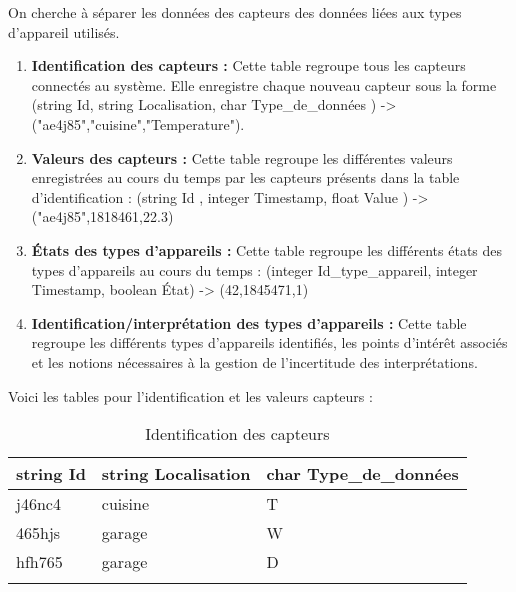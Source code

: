 \documentclass[10pt,a4paper]{article}
\begin{document}
On cherche à séparer les données des capteurs des données liées aux types d'appareil utilisés.
\begin{enumerate}
\item \textbf{Identification des capteurs :} Cette table regroupe tous les capteurs connectés au système. Elle enregistre chaque nouveau capteur sous la forme (string Id, string Localisation, char Type\_de\_données ) -> ("ae4j85","cuisine","Temperature").
\item \textbf{Valeurs des capteurs :} Cette table regroupe les différentes valeurs enregistrées au cours 
du temps par les capteurs présents dans la table d'identification : (string Id , integer Timestamp, float Value ) -> ("ae4j85",1818461,22.3)
\item \textbf{États des types d'appareils : } Cette table regroupe les différents états des types d'appareils au cours du temps : (integer Id\_type\_appareil, integer Timestamp, boolean État) -> (42,1845471,1)
\item \textbf{Identification/interprétation des types d'appareils :} Cette table regroupe les différents types d'appareils identifiés, les points d'intérêt associés et les notions nécessaires à la gestion de l'incertitude des interprétations.
\end{enumerate}
\newpage
Voici les tables pour l'identification et les valeurs capteurs :
\begin{table}[h!]
    \centering
    \begin{tabular}{|l|l|l|}
    \hline
    \rowcolor[HTML]{EFEFEF} 
    string Id & string Localisation & char Type\_de\_données \\ \hline
    j46nc4    & cuisine             & T                      \\ \hline
    465hjs    & garage              & W                      \\ \hline
    hfh765    & garage              & D                      \\ \hline
              &                     &                       
    \end{tabular}
    \caption{Identification des capteurs}
\end{table}
\end{document}
